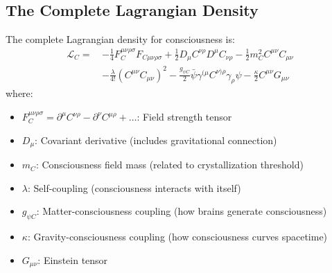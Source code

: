 \subsection{The Complete Lagrangian Density}

\begin{defn}\label{def:consciousness-lagrangian}
The complete Lagrangian density for consciousness is:
\begin{equation}
\boxed{
\begin{aligned}
\mathcal{L}_C =\, & -\frac{1}{4}F^{\mu\nu\rho\sigma}_C F_{C\mu\nu\rho\sigma} + \frac{1}{2}D_\mu C^{\nu\rho} D^\mu C_{\nu\rho} - \frac{1}{2}m_C^2 C^{\mu\nu}C_{\mu\nu}\\
& -\frac{\lambda}{4!}(C^{\mu\nu}C_{\mu\nu})^2 - \frac{g_{\psi C}}{2}\bar{\psi}\gamma^{(\mu}C^{\nu)\rho}\gamma_\rho\psi - \frac{\kappa}{2}C^{\mu\nu}G_{\mu\nu}
\end{aligned}
}
\end{equation}
where:
\begin{itemize}
\item $F^{\mu\nu\rho\sigma}_C = \partial^\mu C^{\nu\rho} - \partial^\nu C^{\mu\rho} + \ldots$: Field strength tensor
\item $D_\mu$: Covariant derivative (includes gravitational connection)
\item $m_C$: Consciousness field mass (related to crystallization threshold)
\item $\lambda$: Self-coupling (consciousness interacts with itself)
\item $g_{\psi C}$: Matter-consciousness coupling (how brains generate consciousness)
\item $\kappa$: Gravity-consciousness coupling (how consciousness curves spacetime)
\item $G_{\mu\nu}$: Einstein tensor
\end{itemize}
\end{defn}

